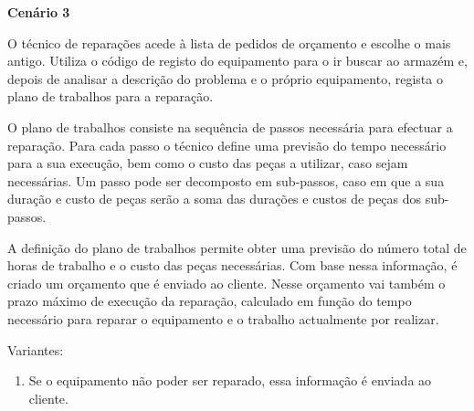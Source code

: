 \documentclass[../relatorio.tex]{subfiles}
\begin{document}
\textbf{Cenário 3} \label{cenario_3}

O técnico de reparações acede à lista de pedidos de orçamento e escolhe o mais antigo. Utiliza o código de registo do equipamento para o ir buscar
ao armazém e, depois de analisar a descrição do problema e o próprio equipamento, regista o plano de trabalhos para a reparação.

O plano de trabalhos consiste na sequência de passos necessária para efectuar a reparação. Para cada passo o técnico define uma previsão do tempo
necessário para a sua execução, bem como o custo das peças a utilizar, caso
sejam necessárias. Um passo pode ser decomposto em sub-passos, caso em
que a sua duração e custo de peças serão a soma das durações e custos de
peças dos sub-passos.

A definição do plano de trabalhos permite obter uma previsão do número total de horas de trabalho e o custo das peças necessárias. Com base nessa
informação, é criado um orçamento que é enviado ao cliente. Nesse orçamento vai também o prazo máximo de execução da reparação, calculado
em função do tempo necessário para reparar o equipamento e o trabalho
actualmente por realizar.


Variantes:
\begin{enumerate}
    \item Se o equipamento não poder ser reparado, essa informação é enviada ao cliente.
\end{enumerate}
\end{document}
